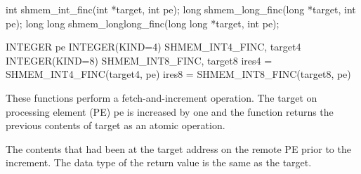 
\synC   %
 
 int shmem_int_finc(int *target, int pe);
 long shmem_long_finc(long *target, int pe);
 long long shmem_longlong_finc(long long *target, int pe);



\synF   %

 INTEGER pe 
 INTEGER(KIND=4) SHMEM_INT4_FINC, target4
 INTEGER(KIND=8) SHMEM_INT8_FINC, target8
 ires4 = SHMEM_INT4_FINC(target4, pe)
 ires8 = SHMEM_INT8_FINC(target8, pe)

{
   These functions perform a fetch-and-increment operation. The target on
   processing element (PE) pe is increased by one and the function returns
   the previous contents of target as an atomic operation.
}

{
{The contents that had been at the target address on the remote PE prior to the increment. The data type of the return value is the same as the target.}
}


{
}


\eAPI



	
